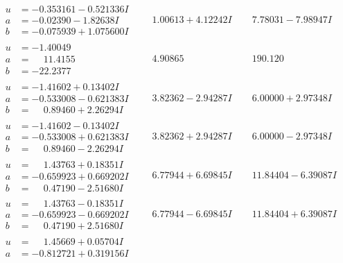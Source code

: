 \documentclass[1p]{elsarticle_modified}
\theoremstyle{definition}
\begin{document}
$$\begin{array}{c|c|c}
\begin{aligned}
u &= -0.353161 - 0.521336 I \\
a &= -0.02390 - 1.82638 I \\
b &= -0.075939 + 1.075600 I\end{aligned}
 & \phantom{-}1.00613 + 4.12242 I & \phantom{-}7.78031 - 7.98947 I \\ \hline\begin{aligned}
u &= -1.40049\phantom{ +0.000000I} \\
a &= \phantom{-}11.4155\phantom{ +0.000000I} \\
b &= -22.2377\phantom{ +0.000000I}\end{aligned}
 & \phantom{-}4.90865\phantom{ +0.000000I} & \phantom{-}190.120\phantom{ +0.000000I} \\ \hline\begin{aligned}
u &= -1.41602 + 0.13402 I \\
a &= -0.533008 - 0.621383 I \\
b &= \phantom{-}0.89460 + 2.26294 I\end{aligned}
 & \phantom{-}3.82362 - 2.94287 I & \phantom{-}6.00000 + 2.97348 I \\ \hline\begin{aligned}
u &= -1.41602 - 0.13402 I \\
a &= -0.533008 + 0.621383 I \\
b &= \phantom{-}0.89460 - 2.26294 I\end{aligned}
 & \phantom{-}3.82362 + 2.94287 I & \phantom{-}6.00000 - 2.97348 I \\ \hline\begin{aligned}
u &= \phantom{-}1.43763 + 0.18351 I \\
a &= -0.659923 + 0.669202 I \\
b &= \phantom{-}0.47190 - 2.51680 I\end{aligned}
 & \phantom{-}6.77944 + 6.69845 I & \phantom{-}11.84404 - 6.39087 I \\ \hline\begin{aligned}
u &= \phantom{-}1.43763 - 0.18351 I \\
a &= -0.659923 - 0.669202 I \\
b &= \phantom{-}0.47190 + 2.51680 I\end{aligned}
 & \phantom{-}6.77944 - 6.69845 I & \phantom{-}11.84404 + 6.39087 I \\ \hline\begin{aligned}
u &= \phantom{-}1.45669 + 0.05704 I \\
a &= -0.812721 + 0.319156 I \\

\end{aligned}
\end{array}$$
\end{document}
